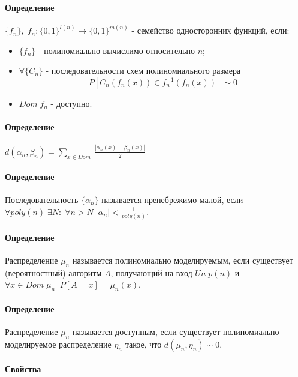 \documentclass[12pt, a4paper]{article}
\newcommand{\dom}{Dom \;}
\newcommand{\uniform}{Un \;}
\begin{document}
\paragraph{Определение} $\{f_n\}, \; f_n : \{0, 1\}^{l(n)} \rightarrow \{0, 1\}^{m(n)}$ - семейство односторонних функций, если:

\begin{itemize}
 \item $\{f_n\}$ - полиномиально вычислимо относительно $n$;
 \item $\forall \{C_n\}$ - последовательности схем полиномиального размера
 \[
  P[C_n(f_n(x)) \in f_n^{-1}(f_n(x))] \sim 0
 \]
 
 \item \mapsto $\dom f_n$ - доступно.

\end{itemize}

\paragraph{Определение} $d(\alpha_n, \beta_n) = \sum\limits_{x \in \dom} \frac{|\alpha_n(x) - \beta_n(x)|}{2}$

\paragraph{Определение} Последовательность $\{\alpha_n\}$ называется пренебрежимо малой, если $\forall poly(n) \; \exists N : \; \forall n > N \; |\alpha_n| < \frac{1}{poly(n)}$.

\paragraph{Определение} Распределение $\mu_n$ называется полиномиально моделируемым, если существует (вероятностный) алгоритм $A$, получающий на вход $\uniform p(n)$ и $\forall x \in \dom \mu_n \; \; P[A = x] = \mu_n(x)$.

\paragraph{Определение} Распределение $\mu_n$ называется доступным, если существует полиномиально моделируемое распределение $\eta_n$ такое, что $d(\mu_n, \eta_n) \sim 0$.

\paragraph{Свойства}
\end{document}
